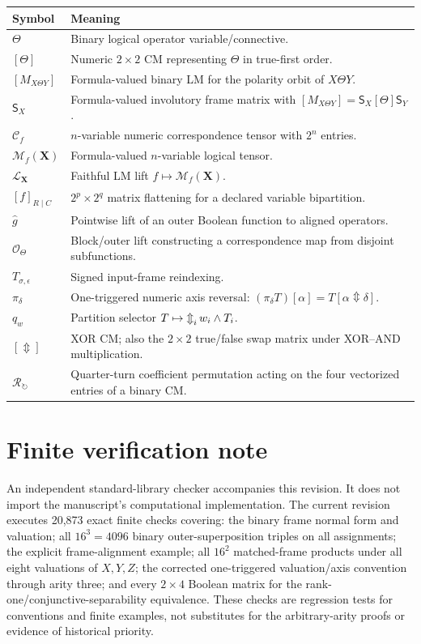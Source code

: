 \documentclass[11pt]{article}
\theoremstyle{definition}
\theoremstyle{remark}
\newcommand{\cC}{\mathcal C}
\newcommand{\cM}{\mathcal M}
\newcommand{\cO}{\mathcal O}
\newcommand{\xor}{\mathbin{\Updownarrow}}
\newcommand{\bigxor}{\mathop{\Updownarrow}\displaylimits}
\begin{document}
\begin{center}\small
\begin{tabular}{p{.25\linewidth}p{.64\linewidth}}
\toprule
Symbol & Meaning\\
\midrule
$\Theta$ & Binary logical operator variable/connective.\\
$[\Theta]$ & Numeric $2\times2$ CM representing $\Theta$ in true-first order.\\
$[M_{X\Theta Y}]$ & Formula-valued binary LM for the polarity orbit of $X\Theta Y$.\\
$\mathsf S_X$ & Formula-valued involutory frame matrix with $[M_{X\Theta Y}]=\mathsf S_X[\Theta]\mathsf S_Y$.\\
$\cC_f$ & $n$-variable numeric correspondence tensor with $2^n$ entries.\\
$\cM_f(\mathbf X)$ & Formula-valued $n$-variable logical tensor.\\
$\mathcal L_{\mathbf X}$ & Faithful LM lift $f\mapsto\cM_f(\mathbf X)$.\\
$[f]_{R\mid C}$ & $2^p\times2^q$ matrix flattening for a declared variable bipartition.\\
$\widehat g$ & Pointwise lift of an outer Boolean function to aligned operators.\\
$\cO_\Theta$ & Block/outer lift constructing a correspondence map from disjoint subfunctions.\\
$T_{\sigma,\epsilon}$ & Signed input-frame reindexing.\\
$\pi_\delta$ & One-triggered numeric axis reversal: $(\pi_\delta T)[\alpha]=T[\alpha\xor\delta]$.\\
$q_w$ & Partition selector $T\mapsto\bigxor_i w_i\land T_i$.\\
$[\Updownarrow]$ & XOR CM; also the $2\times2$ true/false swap matrix under XOR--AND multiplication.\\
$\mathcal R_{\circlearrowright}$ & Quarter-turn coefficient permutation acting on the four vectorized entries of a binary CM.\\
\bottomrule
\end{tabular}
\end{center}

\section{Finite verification note}
An independent standard-library checker accompanies this revision.  It does not import the manuscript's computational implementation.  The current revision executes 20,873 exact finite checks covering: the binary frame normal form and valuation; all $16^3=4096$ binary outer-superposition triples on all assignments; the explicit frame-alignment example; all $16^2$ matched-frame products under all eight valuations of $X,Y,Z$; the corrected one-triggered valuation/axis convention through arity three; and every $2\times4$ Boolean matrix for the rank-one/conjunctive-separability equivalence.  These checks are regression tests for conventions and finite examples, not substitutes for the arbitrary-arity proofs or evidence of historical priority.
\end{document}
